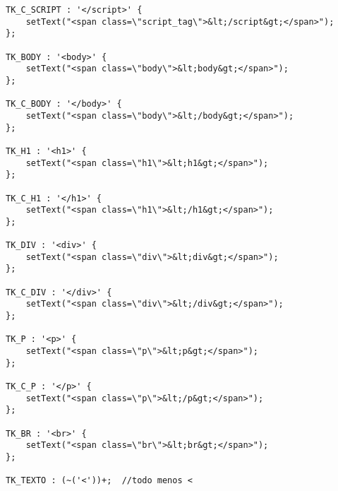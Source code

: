 {\begin{verbatim}
TK_C_SCRIPT : '</script>' {
    setText("<span class=\"script_tag\">&lt;/script&gt;</span>");
};

TK_BODY : '<body>' {
    setText("<span class=\"body\">&lt;body&gt;</span>");
};

TK_C_BODY : '</body>' {
    setText("<span class=\"body\">&lt;/body&gt;</span>");
};

TK_H1 : '<h1>' {
    setText("<span class=\"h1\">&lt;h1&gt;</span>");
};

TK_C_H1 : '</h1>' {
    setText("<span class=\"h1\">&lt;/h1&gt;</span>");
};

TK_DIV : '<div>' {
    setText("<span class=\"div\">&lt;div&gt;</span>");
};

TK_C_DIV : '</div>' {
    setText("<span class=\"div\">&lt;/div&gt;</span>");
};

TK_P : '<p>' {
    setText("<span class=\"p\">&lt;p&gt;</span>");
};

TK_C_P : '</p>' {
    setText("<span class=\"p\">&lt;/p&gt;</span>");
};

TK_BR : '<br>' {
    setText("<span class=\"br\">&lt;br&gt;</span>");
};

TK_TEXTO : (~('<'))+;  //todo menos <

\end{verbatim}
}